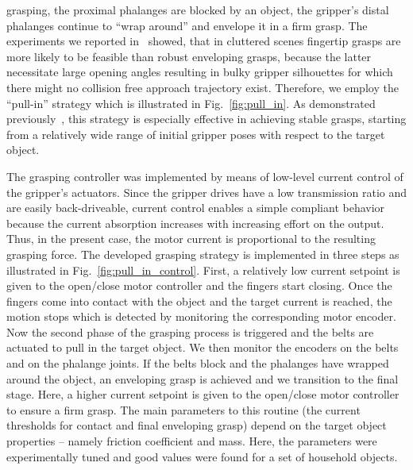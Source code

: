  grasping, the proximal phalanges are blocked by an object, the gripper’s distal phalanges continue
 to ``wrap around'' and envelope it in a firm grasp. The experiments we reported in~\cite{Krug14a}
 showed, that in cluttered scenes fingertip grasps are more likely to be feasible than robust
 enveloping grasps, because the latter necessitate large opening angles resulting in bulky gripper
 silhouettes for which there might no collision free approach trajectory exist. Therefore, we employ
 the ``pull-in'' strategy which is illustrated in Fig.~\ref{fig:pull_in}. As demonstrated
 previously~\cite{Krug14c}, this strategy is especially effective in achieving stable grasps,
 starting from a relatively wide range of initial gripper poses with respect to the target object.
\par
The grasping controller was implemented by means of low-level current control of the gripper's
actuators. Since the gripper drives have a low transmission ratio and are easily back-driveable,
current control enables a simple compliant behavior because the current absorption increases with
increasing effort on the output. Thus, in the present case, the motor current is proportional to the
resulting grasping force. The developed grasping strategy is implemented in three steps as
illustrated in Fig.~\ref{fig:pull_in_control}. First, a relatively low current setpoint is given to
the open/close motor controller and the fingers start closing. Once the fingers come into contact
with the object and the target current is reached, the motion stops which is detected by monitoring
the corresponding motor encoder. Now the second phase of the grasping process is triggered and the
belts are actuated to pull in the target object.  We then monitor the encoders on the belts and on
the phalange joints. If the belts block and the phalanges have wrapped around the object, an
enveloping grasp is achieved and we transition to the final stage. Here, a higher current setpoint
is given to the open/close motor controller to ensure a firm grasp. The main parameters to this
routine (the current thresholds for contact and final enveloping grasp) depend on the target object
properties -- namely friction coefficient and mass. Here, the parameters were experimentally tuned
and good values were found for a set of household objects.
